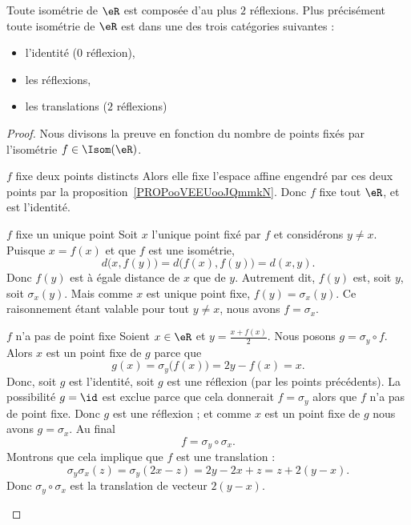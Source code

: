 \begin{theorem}
	Toute isométrie de \( \eR\) est composée d'au plus \( 2\) réflexions. Plus précisément toute isométrie de \( \eR\) est dans une des trois catégories suivantes :
	\begin{itemize}
		\item l'identité (\( 0\) réflexion),
		\item les réflexions,
		\item les translations (\( 2\) réflexions)
	\end{itemize}
\end{theorem}

\begin{proof}
	Nous divisons la preuve en fonction du nombre de points fixés par l'isométrie \( f\in\Isom(\eR)\).
	\begin{subproof}
		\item[\( f\) fixe deux points distincts]
		Alors elle fixe l'espace affine engendré par ces deux points par la proposition~\ref{PROPooVEEUooJQmmkN}. Donc \( f\) fixe tout \( \eR\), et est l'identité.
		\item[\( f\) fixe un unique point]
		Soit \( x\) l'unique point fixé par \( f\) et considérons \( y\neq x\). Puisque \( x=f(x)\) et que \( f\) est une isométrie,
		\begin{equation}
			d\big( x,f(y) \big)=d\big( f(x),f(y) \big)=d(x,y).
		\end{equation}
		Donc \( f(y)\) est à égale distance de \( x\) que de \( y\). Autrement dit, \( f(y)\) est, soit \( y\), soit \( \sigma_x(y)\). Mais comme \( x\) est unique point fixe, \( f(y)=\sigma_x(y)\). Ce raisonnement étant valable pour tout \( y\neq x \), nous avons \( f=\sigma_x\).
		\item[\( f\) n'a pas de point fixe]
		Soient \( x\in \eR\) et \( y=\frac{ x+f(x) }{ 2 }\). Nous posons \( g=\sigma_y\circ f\). Alors \( x\) est un point fixe de \( g\) parce que
		\begin{equation}
			g(x)=\sigma_y\big( f(x) \big)=2y-f(x)=x.
		\end{equation}
		Donc, soit \( g\) est l'identité, soit \( g\) est une réflexion (par les points précédents). La possibilité \( g=\id\) est exclue parce que cela donnerait \( f=\sigma_y\) alors que \( f\) n'a pas de point fixe. Donc \( g\) est une réflexion ; et comme \( x\) est un point fixe de \( g\) nous avons \( g=\sigma_x\). Au final
		\begin{equation}
			f=\sigma_y\circ\sigma_x.
		\end{equation}
		Montrons que cela implique que \( f\) est une translation :
		\begin{equation}
			\sigma_y\sigma_x(z)=\sigma_y(2x-z)=2y-2x+z=z+2(y-x).
		\end{equation}
		Donc \( \sigma_y\circ\sigma_x\) est la translation de vecteur \( 2(y-x)\).
	\end{subproof}
\end{proof}


